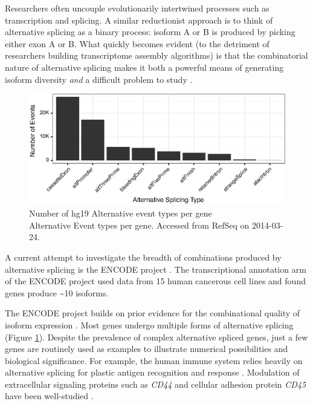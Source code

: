     Researchers often uncouple evolutionarily intertwined processes such as transcription and splicing. A similar reductionist approach is to think of alternative splicing as a binary process: isoform A or B is produced by picking either exon A or B. What quickly becomes evident (to the detriment of researchers building transcriptome assembly algorithms) is that the combinatorial nature of alternative splicing makes it both a powerful means of generating isoform diversity \textit{and} a difficult problem to study \citep{Trapnell2012a}.

    \begin{figure} %
      \centering 
      \includegraphics{Figures/Intro/ASEventTypesPlot.eps}
      \caption[Number of hg19 Alternative Event types]
      {
        Number of hg19 Alternative event types per gene\\[0.25cm]
        Alternative Event types per gene. Accessed from RefSeq on 2014-03-24.
        }
      \label{Intro:fig:asEventsBarChart}
      \end{figure}

    A current attempt to investigate the breadth of combinations produced by alternative splicing is the ENCODE project \citep{Birney2007,Dunham2012}. The transcriptional annotation arm of the ENCODE project \citep{Djebali2012,Derrien2012} used data from 15 human cancerous cell lines and found genes produce \textasciitilde10 isoforms.

    The ENCODE project builds on prior evidence for the combinational quality of isoform expression \citep{Wang2008,Pan2008}. Most genes undergo multiple forms of alternative splicing (Figure \ref{Intro:fig:asEventsBarChart}). Despite the prevalence of complex alternative spliced genes, just a few genes are routinely used as examples to illustrate numerical possibilities and biological significance. For example, the human immune system relies heavily on alternative splicing for plastic antigen recognition and response \citep{Lynch2004}. Modulation of extracellular signaling proteins such as \textit{CD44} and cellular adhesion protein \textit{CD45} have been well-studied \citep{Zikherman2008,Ponta2003}.

